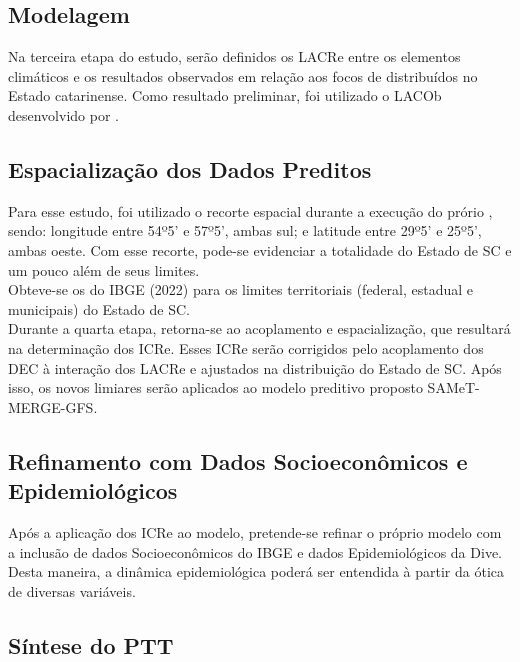 \subsection{Modelagem}

\indent Na terceira etapa do estudo, serão definidos os  \acrfull{LACRe} entre os elementos climáticos e os resultados observados em relação aos focos de  distribuídos no Estado catarinense. Como resultado preliminar, foi utilizado o \acrshort{LACOb} desenvolvido por .


\subsection{Espacialização dos Dados Preditos}

\indent Para esse estudo, foi utilizado o recorte espacial durante a execução do prório , sendo: longitude entre 54º5' e 57º5', ambas sul; e latitude entre 29º5' e 25º5', ambas oeste. Com esse recorte, pode-se evidenciar a totalidade do Estado de \acrlong{SC} e um pouco além de seus limites.\\
\indent Obteve-se os  do \acrshort{IBGE} (2022) para os limites territoriais (federal, estadual e municipais) do Estado de \acrlong{SC}.\\

\indent Durante a quarta etapa, retorna-se ao acoplamento e espacialização, que resultará na determinação dos \acrfull{ICRe}. Esses \acrshort{ICRe} serão corrigidos pelo acoplamento dos \acrshort{DEC} à interação dos \acrshort{LACRe} e ajustados na distribuição do Estado de \acrlong{SC}. Após isso, os novos limiares serão aplicados ao modelo preditivo proposto \acrshort{SAMeT}-\acrshort{MERGE}-\acrshort{GFS}.


\subsection{Refinamento com Dados Socioeconômicos e Epidemiológicos}

\indent Após a aplicação dos \acrshort{ICRe} ao modelo, pretende-se refinar o próprio modelo com a inclusão de dados Socioeconômicos do \acrshort{IBGE} e dados Epidemiológicos da \acrshort{Dive}. Desta maneira, a dinâmica epidemiológica poderá ser entendida à partir da ótica de diversas variáveis.


\subsection{Síntese do \acrfull{PTT}} 

